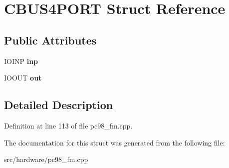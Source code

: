 \hypertarget{structCBUS4PORT}{\section{C\-B\-U\-S4\-P\-O\-R\-T Struct Reference}
\label{structCBUS4PORT}
}
\subsection*{Public Attributes}
\begin{DoxyCompactItemize}
\item 
\hypertarget{structCBUS4PORT_acdfa7680ca648b64bae4afc5b7ccf8a6}{I\-O\-I\-N\-P {\bfseries inp}}\label{structCBUS4PORT_acdfa7680ca648b64bae4afc5b7ccf8a6}

\item 
\hypertarget{structCBUS4PORT_ad38129fe2ce76c6bd2e1f1e6cd7948b3}{I\-O\-O\-U\-T {\bfseries out}}\label{structCBUS4PORT_ad38129fe2ce76c6bd2e1f1e6cd7948b3}

\end{DoxyCompactItemize}


\subsection{Detailed Description}


Definition at line 113 of file pc98\-\_\-fm.\-cpp.



The documentation for this struct was generated from the following file\-:\begin{DoxyCompactItemize}
\item 
src/hardware/pc98\-\_\-fm.\-cpp\end{DoxyCompactItemize}
